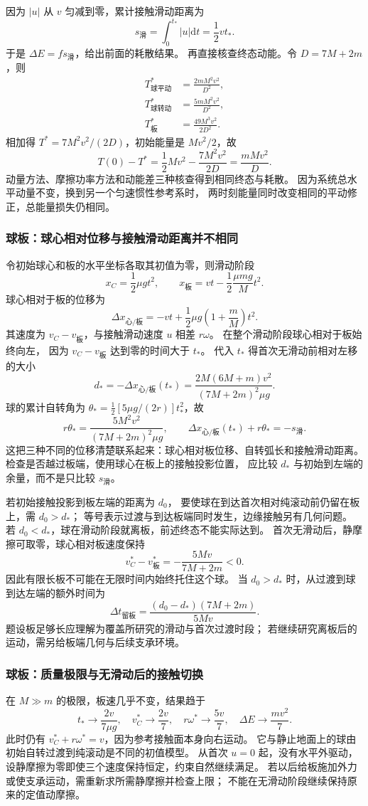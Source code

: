 \documentclass[UTF8,zihao=-4,fontset=fandol,a4paper]{ctexart}
\newcommand{\dd}{\mathrm d}
\begin{document}
因为 $|u|$ 从 $v$ 匀减到零，累计接触滑动距离为
\[
s_{\text{滑}}=\int_0^{t_*}|u|\dd t=\frac12vt_*.
\]
于是 $\Delta E=fs_{\text{滑}}$，给出前面的耗散结果。
再直接核查终态动能。令 $D=7M+2m$，则
\begin{align*}
T_{\text{球平动}}^*&=\frac{2mM^2v^2}{D^2},\\
T_{\text{球转动}}^*&=\frac{5mM^2v^2}{D^2},\\
T_{\text{板}}^*&=\frac{49M^3v^2}{2D^2}.
\end{align*}
相加得 $T^*=7M^2v^2/(2D)$，初始能量是 $Mv^2/2$，故
\[
T(0)-T^*=\frac12Mv^2-\frac{7M^2v^2}{2D}
=\frac{mMv^2}{D}.
\]
动量方法、摩擦功率方法和动能差三种核查得到相同终态与耗散。
因为系统总水平动量不变，换到另一个匀速惯性参考系时，
两时刻能量同时改变相同的平动修正，总能量损失仍相同。

\subsubsection*{球板：球心相对位移与接触滑动距离并不相同}
令初始球心和板的水平坐标各取其初值为零，则滑动阶段
\[
x_C=\frac12\mu gt^2,\qquad
x_{\text{板}}=vt-\frac12\frac{\mu mg}{M}t^2.
\]
球心相对于板的位移为
\[
\Delta x_{\text{心/板}}
=-vt+\frac12\mu g\left(1+\frac mM\right)t^2.
\]
其速度为 $v_C-v_{\text{板}}$，与接触滑动速度 $u$ 相差 $r\omega$。
在整个滑动阶段球心相对于板始终向左，
因为 $v_C-v_{\text{板}}$ 达到零的时间大于 $t_*$。
代入 $t_*$ 得首次无滑动前相对左移的大小
\[
d_*=-\Delta x_{\text{心/板}}(t_*)
=\frac{2M(6M+m)v^2}{(7M+2m)^2\mu g}.
\]
球的累计自转角为 $\theta_*=\tfrac12[5\mu g/(2r)]t_*^2$，故
\[
r\theta_*=
\frac{5M^2v^2}{(7M+2m)^2\mu g},
\qquad
\Delta x_{\text{心/板}}(t_*)+r\theta_*=-s_{\text{滑}}.
\]
这把三种不同的位移清楚联系起来：球心相对板位移、自转弧长和接触滑动距离。
检查是否越过板端，使用球心在板上的接触投影位置，
应比较 $d_*$ 与初始到左端的余量，而不是只比较 $s_{\text{滑}}$。

若初始接触投影到板左端的距离为 $d_0$，
要使球在到达首次相对纯滚动前仍留在板上，需 $d_0>d_*$；
等号表示过渡与到达板端同时发生，边缘接触另有几何问题。
若 $d_0<d_*$，球在滑动阶段就离板，前述终态不能实际达到。
首次无滑动后，静摩擦可取零，球心相对板速度保持
\[
v_C^*-v_{\text{板}}^*=-\frac{5Mv}{7M+2m}<0.
\]
因此有限长板不可能在无限时间内始终托住这个球。
当 $d_0>d_*$ 时，从过渡到球到达左端的额外时间为
\[
\Delta t_{\text{留板}}=
\frac{(d_0-d_*)(7M+2m)}{5Mv}.
\]
题设板足够长应理解为覆盖所研究的滑动与首次过渡时段；
若继续研究离板后的运动，需另给板端几何与后续支承环境。

\subsubsection*{球板：质量极限与无滑动后的接触切换}
在 $M\gg m$ 的极限，板速几乎不变，结果趋于
\[
t_*\to\frac{2v}{7\mu g},\quad
v_C^*\to\frac{2v}{7},\quad
r\omega^*\to\frac{5v}{7},\quad
\Delta E\to\frac{mv^2}{7}.
\]
此时仍有 $v_C^*+r\omega^*=v$，因为参考接触面本身向右运动。
它与静止地面上的球由初始自转过渡到纯滚动是不同的初值模型。
从首次 $u=0$ 起，没有水平外驱动，
设静摩擦为零即使三个速度保持恒定，约束自然继续满足。
若以后给板施加外力或使支承运动，需重新求所需静摩擦并检查上限；
不能在无滑动阶段继续保持原来的定值动摩擦。
\end{document}
